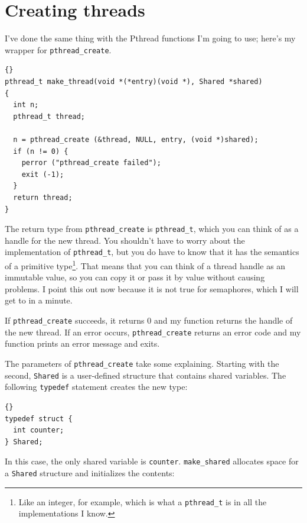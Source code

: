 \documentclass{book}
\begin{document}
\section{Creating threads}

I've done the same thing with the Pthread functions I'm going to use;
here's my wrapper for {\tt pthread\_create}.

\begin{latin}
\begin{lstlisting}[title={}]{}
pthread_t make_thread(void *(*entry)(void *), Shared *shared)
{
  int n;
  pthread_t thread;

  n = pthread_create (&thread, NULL, entry, (void *)shared);
  if (n != 0) {
    perror ("pthread_create failed");
    exit (-1);
  }
  return thread;
}
\end{lstlisting}
\end{latin}

The return type from {\tt pthread\_create} is {\tt pthread\_t},
which you can think of as a handle for the new thread.  You
shouldn't have to worry about the implementation of {\tt pthread\_t},
but you do have to know that it has the semantics of a primitive
type\footnote{Like an integer, for example, which is what a
{\tt pthread\_t} is in all the implementations I know.}.  That
means that you can think of a thread handle as an immutable
value, so you can copy it or pass it by value without causing
problems.  I point this out now because it is not true for
semaphores, which I will get to in a minute.

If {\tt pthread\_create} succeeds, it returns 0 and my function
returns the handle of the new thread.
If an error occurs, {\tt pthread\_create} 
returns an error code and my function prints an error message
and exits.

The parameters of {\tt pthread\_create} take some
explaining.  Starting with the second,
{\tt Shared}
is a user-defined structure that contains shared variables.
The following {\tt typedef} statement creates the new type:

\begin{latin}
\begin{lstlisting}[title={}]{}
typedef struct {
  int counter;
} Shared;
\end{lstlisting}
\end{latin}

In this case, the only shared variable is {\tt counter}.
{\tt make\_shared} allocates
space for a {\tt Shared} structure and initializes the contents:
\end{document}
